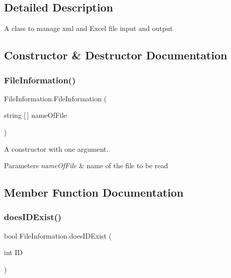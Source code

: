 \subsection{Detailed Description}
A class to manage xml and Excel file input and output 

\subsection{Constructor \& Destructor Documentation}
\mbox{\label{class_file_information_ae72cab35d7d963bfbe8dafc210ee2988}} 
\subsubsection{\texorpdfstring{FileInformation()}{FileInformation()}}
{\footnotesize\ttfamily File\+Information.\+File\+Information (\begin{DoxyParamCaption}\item[{string \mbox{[}$\,$\mbox{]}}]{name\+Of\+File }\end{DoxyParamCaption})\hspace{0.3cm}{\ttfamily [inline]}}



A constructor with one argument. 


\begin{DoxyParams}{Parameters}
{\em name\+Of\+File} & name of the file to be read \\
\hline
\end{DoxyParams}


\subsection{Member Function Documentation}
\mbox{\label{class_file_information_a4560ca8eebcef612a9e562f1cca644e8}} 
\subsubsection{\texorpdfstring{doesIDExist()}{doesIDExist()}}
{\footnotesize\ttfamily bool File\+Information.\+does\+I\+D\+Exist (\begin{DoxyParamCaption}\item[{int}]{ID }\end{DoxyParamCaption})\hspace{0.3cm}{\ttfamily [inline]}}



